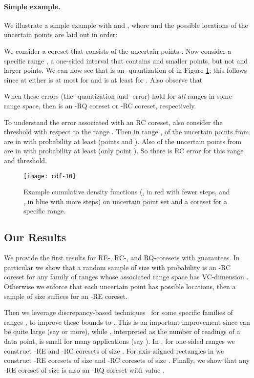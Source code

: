 \documentclass[11pt]{myclass}
\newcommand{\RC}{\textsf{RC}\xspace}
\newcommand{\RE}{\textsf{RE}\xspace}
\newcommand{\RQ}{\textsf{RQ}\xspace}
\newcommand{\Paragraph}[1]{\paragraph{\sffamily\textbf{#1.}}}
\begin{document}
\Paragraph{Simple example}
We illustrate a simple example with  and , where  and the  possible locations of the  uncertain points are laid out in order:


We consider a coreset  that consists of the uncertain points . 
Now consider a specific range , a one-sided interval that contains  and smaller points, but not  and larger points.  
We can now see that  is an -quantization of  in Figure \ref{fig:cdf-10}; this follows since at  either  is at most  for  and is at least  for .  
Also observe that 
  
When these errors (the -quantization and -error) hold for \emph{all} ranges in some range space, then  is an -\RQ coreset or -\RC coreset, respectively.  

To understand the error associated with an \RC coreset, also consider the threshold  with respect to the range .  Then in range ,  of the uncertain points from  are in  with probability at least  (points  and ).  Also  of the uncertain points from  are in  with probability at least  (only point ).  So there is  \RC error for this range and threshold.  


\begin{figure}[t]
\centering
\texttt{[image: cdf-10]}
\caption{Example cumulative density functions  (, in red with fewer steps, and , in blue with more steps) on uncertain point set  and a coreset  for a specific range.}
\label{fig:cdf-10}
\end{figure}

\subsection{Our Results}

We provide the first results for \RE-, \RC-, and \RQ-coresets with guarantees.  In particular we show that a random sample  of size  with probability  is an -\RC coreset for any family of ranges  whose associated range space has VC-dimension .  
Otherwise we enforce that each uncertain point has  possible locations, then a sample  of size  suffices for an -\RE coreset.  

Then we leverage discrepancy-based techniques~\cite{Mat99,Cha01} for some specific families of ranges , to improve these bounds to .  This is an important improvement since  can be quite large (say  or more), while , interpreted as the number of readings of a data point, is small for many applications (say ).  
In , for one-sided ranges we construct -\RE and -\RC coresets of size .
For axis-aligned rectangles in  we construct -\RE coresets of size  and -\RC coresets of size .  
Finally, we show that any -\RE coreset of size  is also an -\RQ coreset with value .  
\end{document}
